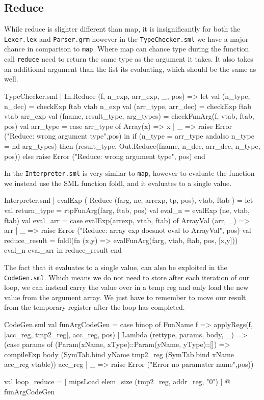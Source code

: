 \documentclass[11pt,a4paper,oneside]{report}
\begin{document}
\subsection*{Reduce}
While reduce is slighter different than map, it is insignificantly for both the \texttt{Lexer.lex} and \texttt{Parser.grm} however in the \texttt{TypeChecker.sml} we have a major chance in comparison to \texttt{map}. Where map can chance type during the function call \texttt{reduce} need to return the same type as the argument it takes. It also takes an additional argument than the list its evaluating, which should be the same as well.
\begin{code}[firstnumber=253]{TypeChecker.sml}
| In.Reduce (f, n_exp, arr_exp, _, pos)
      =>
      let val (n_type, n_dec) = checkExp ftab vtab n_exp
          val (arr_type, arr_dec) = checkExp ftab vtab arr_exp
          val (fname, result_type, arg_types) =
          checkFunArg(f, vtab, ftab, pos)
          val arr_type = case arr_type of
                      Array(x) => x
                    | _ => raise Error
                    ("Reduce: wrong argument type",pos)
      in
          if (n_type = arr_type andalso n_type = hd arg_types)
          then (result_type,
          Out.Reduce(fname, n_dec, arr_dec, n_type, pos))
          else raise Error ("Reduce: wrong argument type", pos)
      end
\end{code}

In the \texttt{Interpreter.sml} is very similar to \texttt{map}, however to evaluate the function we instead use the SML function foldl, and it evaluates to a single value.
\begin{code}[firstnumber=305]{Interpreter.sml}
  | evalExp ( Reduce (farg, ne, arrexp, tp, pos), vtab, ftab ) =
    let
      val return_type = rtpFunArg(farg, ftab, pos)
      val eval_n = evalExp (ne, vtab, ftab)
      val eval_arr = case evalExp(arrexp, vtab, ftab) of
          ArrayVal (arr, _) => arr
        | _ => raise Error
        ("Reduce: array exp doesnot eval to ArrayVal", pos)
      val reduce_result =
       foldl(fn (x,y) =>
       evalFunArg(farg, vtab, ftab, pos, [x,y])) eval_n eval_arr
    in
      reduce_result
    end
\end{code}

The fact that it evaluates to a single value, can also be exploited in the \texttt{CodeGen.sml}. Which means we do not need to store after each iteration of our loop, we can instead carry the value over in a temp reg and only load the new value from the argument array. We just have to remember to move our result from the temporary register after the loop has completed.
\newpage
\begin{code}[firstnumber=662]{CodeGen.sml}
val funArgCodeGen = case binop of
      FunName f => applyRegs(f, [acc_reg, tmp2_reg], acc_reg, pos)
    | Lambda (rettype, params, body, _) => (case params of
           (Param(xName, xType)::Param(yName, yType)::[]) =>
    compileExp body (SymTab.bind yName tmp2_reg
      (SymTab.bind xName acc_reg vtable)) acc_reg
         | _ => raise Error ("Error no paramater name",pos))

val loop_reduce = [ mipsLoad elem_size (tmp2_reg, addr_reg, "0") ]
                  @ funArgCodeGen
\end{code}
\end{document}
